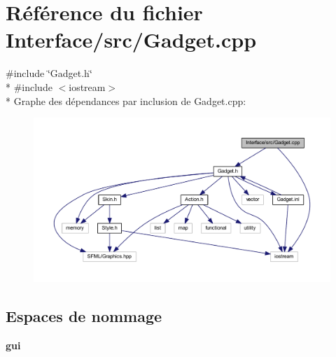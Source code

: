 \section{Référence du fichier Interface/src/\+Gadget.cpp}
\label{_gadget_8cpp}
{\ttfamily \#include \char`\"{}Gadget.\+h\char`\"{}}\\*
{\ttfamily \#include $<$iostream$>$}\\*
Graphe des dépendances par inclusion de Gadget.\+cpp\+:\nopagebreak
\begin{figure}[H]
\begin{center}
\leavevmode
\includegraphics[width=350pt]{_gadget_8cpp__incl}
\end{center}
\end{figure}
\subsection*{Espaces de nommage}
\begin{DoxyCompactItemize}
\item 
 {\bf gui}
\end{DoxyCompactItemize}
